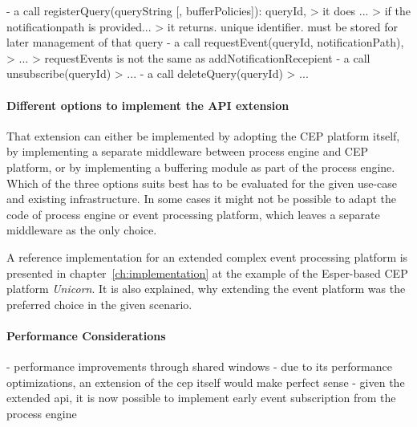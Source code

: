- a call registerQuery(queryString [, bufferPolicies]): queryId, 
> it does ...
> if the notificationpath is provided...
> it returns. unique identifier. must be stored for later management of that query
- a call requestEvent(queryId, notificationPath),
> ...
> requestEvents is not the same as addNotificationRecepient
- a call unsubscribe(queryId)
> ...
- a call deleteQuery(queryId)
> ...


\paragraph{Different options to implement the API extension}

That extension can either be implemented by adopting the CEP platform itself, by implementing a separate middleware between process engine and CEP platform, or by implementing a buffering module as part of the process engine.
Which of the three options suits best has to be evaluated for the given use-case and existing infrastructure. In some cases it might not be possible to adapt the code of process engine or event processing platform, which leaves a separate middleware as the only choice.

A reference implementation for an extended complex event processing platform is presented in chapter~\autoref{ch:implementation} at the example of the Esper-based CEP platform \textit{Unicorn}. It is also explained, why extending the event platform was the preferred choice in the given scenario.

\paragraph{Performance Considerations}
- performance improvements through shared windows
- due to its performance optimizations, an extension of the cep itself would make perfect sense
- given the extended api, it is now possible to implement early event subscription from the process engine 


